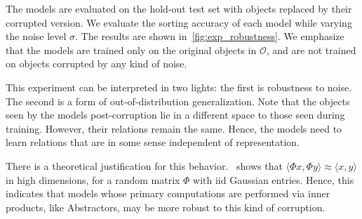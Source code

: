 The models are evaluated on the hold-out test set with objects replaced by their corrupted version. We evaluate the sorting accuracy of each model while varying the noise level $\sigma$. The results are shown in~\cref{fig:exp_robustness}. We emphasize that the models are trained only on the original objects in $\mathcal{O}$, and are not trained on objects corrupted by any kind of noise.

This experiment can be interpreted in two lights: the first is robustness to noise. The second is a form of out-of-distribution generalization. Note that the objects seen by the models post-corruption lie in a different space to those seen during training. However, their relations remain the same. Hence, the models need to learn relations that are in some sense independent of representation.

There is a theoretical justification for this behavior.~\cite{zhouCompressedPrivacySensitive2009} shows that $\langle \Phi x, \Phi y \rangle \approx \langle x, y \rangle$ in high dimensions, for a random matrix $\Phi$ with iid Gaussian entries. Hence, this indicates that models whose primary computations are performed via inner products, like Abstractors, may be more robust to this kind of corruption.

